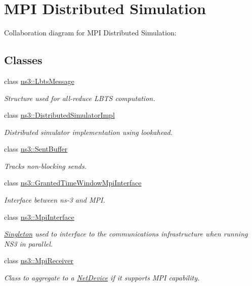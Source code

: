 \hypertarget{group__mpi}{}\section{M\+PI Distributed Simulation}
\label{group__mpi}
Collaboration diagram for M\+PI Distributed Simulation\+:
\subsection*{Classes}
\begin{DoxyCompactItemize}
\item 
class \hyperlink{classns3_1_1LbtsMessage}{ns3\+::\+Lbts\+Message}
\begin{DoxyCompactList}\small\item\em Structure used for all-\/reduce L\+B\+TS computation. \end{DoxyCompactList}\item 
class \hyperlink{classns3_1_1DistributedSimulatorImpl}{ns3\+::\+Distributed\+Simulator\+Impl}
\begin{DoxyCompactList}\small\item\em Distributed simulator implementation using lookahead. \end{DoxyCompactList}\item 
class \hyperlink{classns3_1_1SentBuffer}{ns3\+::\+Sent\+Buffer}
\begin{DoxyCompactList}\small\item\em Tracks non-\/blocking sends. \end{DoxyCompactList}\item 
class \hyperlink{classns3_1_1GrantedTimeWindowMpiInterface}{ns3\+::\+Granted\+Time\+Window\+Mpi\+Interface}
\begin{DoxyCompactList}\small\item\em Interface between ns-\/3 and M\+PI. \end{DoxyCompactList}\item 
class \hyperlink{classns3_1_1MpiInterface}{ns3\+::\+Mpi\+Interface}
\begin{DoxyCompactList}\small\item\em \hyperlink{classns3_1_1Singleton}{Singleton} used to interface to the communications infrastructure when running N\+S3 in parallel. \end{DoxyCompactList}\item 
class \hyperlink{classns3_1_1MpiReceiver}{ns3\+::\+Mpi\+Receiver}
\begin{DoxyCompactList}\small\item\em Class to aggregate to a \hyperlink{classns3_1_1NetDevice}{Net\+Device} if it supports M\+PI capability. \end{DoxyCompactList}\item 

\end{DoxyCompactItemize}
